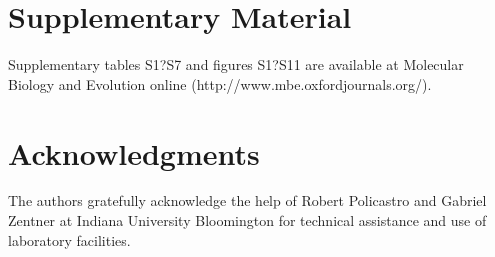 \documentclass[nogrid]{MBE}%
\begin{document}
%
\section{Supplementary Material}
Supplementary tables S1?S7 and figures S1?S11 are available  at Molecular Biology and Evolution
online (http://www.mbe.oxfordjournals.org/).

\section{Acknowledgments}

The authors gratefully acknowledge the help of Robert Policastro and Gabriel Zentner at Indiana University Bloomington for technical assistance and use of laboratory facilities.


\end{document}
